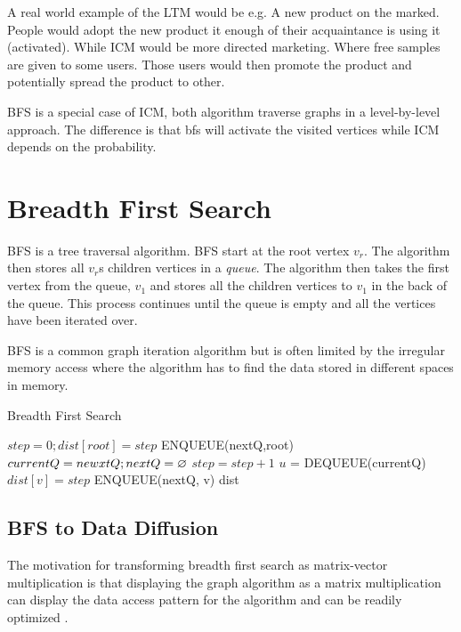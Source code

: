 A real world example of the LTM would be e.g. A new product on the marked. People would adopt the new product it enough of their acquaintance is using it (activated). While ICM would be more directed marketing. Where free samples are given to some users. Those users would then promote the product and potentially spread the product to other.

BFS is a special case of ICM, both algorithm traverse graphs in a level-by-level approach. The difference is that bfs will activate the visited vertices while ICM depends on the probability.


\section{Breadth First Search}
BFS is a tree traversal algorithm. BFS start at the root vertex \textit{$v_r$}. The algorithm then stores all $v_r$s children vertices in a \textit{queue}. The algorithm then takes the first vertex from the queue, \textit{$v_1$} and stores all the children vertices to \textit{$v_1$} in the back of the queue. This process continues until the queue is empty and all the vertices have been iterated over. 

BFS is a common graph iteration algorithm but is often limited by the irregular memory access where the algorithm has to find the data stored in different spaces in memory.

\begin{algorithm}
\caption{Breadth First Search}
\begin{algorithmic}[1]
\State $step = 0; dist[root] = step$
\State ENQUEUE(nextQ,root)
\State $currentQ = newxtQ; nextQ = \oldemptyset$
\State $step = step+1$
\State$ u$ = DEQUEUE(currentQ)
\State $dist[v] = step$
\State ENQUEUE(nextQ, v)
\EndIf
\EndFor
\EndWhile
\EndWhile
\Return dist
\end{algorithmic}
\end{algorithm}


 
\subsection{BFS to Data Diffusion}

The motivation for transforming breadth first search as matrix-vector multiplication is that displaying the graph algorithm as a matrix multiplication can display the data access pattern for the algorithm and can be readily optimized  \cite{AlgoToMath}.

